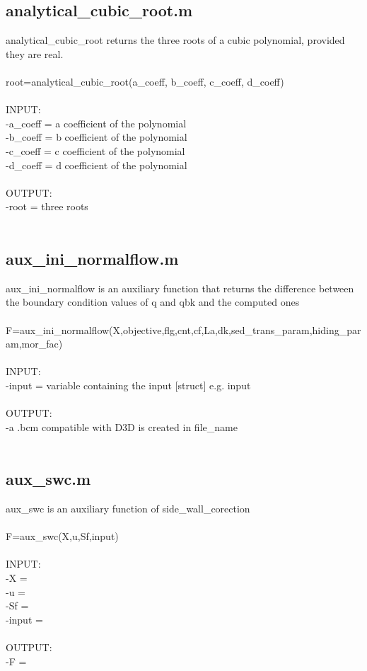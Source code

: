 \subsection{analytical\_cubic\_root.m}
analytical\_cubic\_root returns the three roots of a cubic polynomial, provided they are real. \\ 
 \\ 
root=analytical\_cubic\_root(a\_coeff, b\_coeff, c\_coeff, d\_coeff) \\ 
 \\ 
INPUT: \\ 
   -a\_coeff = a coefficient of the polynomial \\ 
   -b\_coeff = b coefficient of the polynomial \\ 
   -c\_coeff = c coefficient of the polynomial \\ 
   -d\_coeff = d coefficient of the polynomial \\ 
 \\ 
OUTPUT: \\ 
   -root = three roots \\ 
 \\ 
\subsection{aux\_ini\_normalflow.m}
aux\_ini\_normalflow is an auxiliary function that returns the difference between the boundary condition values of q and qbk and the computed ones \\ 
 \\ 
F=aux\_ini\_normalflow(X,objective,flg,cnt,cf,La,dk,sed\_trans\_param,hiding\_param,mor\_fac) \\ 
 \\ 
INPUT: \\ 
   -input = variable containing the input $[$struct$]$ e.g. input \\ 
 \\ 
OUTPUT: \\ 
   -a .bcm compatible with D3D is created in file\_name \\ 
 \\ 
\subsection{aux\_swc.m}
aux\_swc is an auxiliary function of side\_wall\_corection \\ 
 \\ 
F=aux\_swc(X,u,Sf,input) \\ 
 \\ 
INPUT: \\ 
	-X =  \\ 
	-u =  \\ 
	-Sf = \\ 
   -input =  \\ 
 \\ 
OUTPUT: \\ 
   -F =  \\ 
 \\ 
